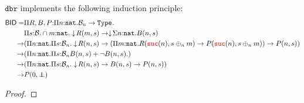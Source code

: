 \begin{lemma}
  $\mathtt{dbr}$ implements the following induction principle: 
  \begin{align*}
    \mathsf{BID} = &\pity{\isOf{R,B,P}{\pity{\isOf{n}{\nat}}{\nseq{n} \to \type{}}}}{\\
          &\pity{\isOf{s}{\baire}}{\intty{\isOf{m}{\nat}}{\squash{R(m,s)}} \to \squash{\sigmaty{\isOf{n}{\nat}}{B(n,s)}}}\\
      \to &(\pity{\isOf{n}{\nat}}{\pity{\isOf{s}{\nseq{n}}}
      {\squash{R(n,s)} \to (\pity{\isOf{m}{\nat}}{R(\suc{n}, s \oplus_n m) \to P(\suc{n}, s \oplus_n m)}) 
      \to P(n,s)}})\\
      \to &(\pity{\isOf{n}{\nat}}{\pity{\isOf{s}{\nseq{n}}{B(n,s) + \neg B(n,s)}}}) \\
      \to &(\pity{\isOf{n}{\nat}}{\pity{\isOf{s}{\nseq{n}}}{\squash{R(n,s)} \to 
      B(n,s) \to P(n,s)}})\\
      \to & P(0,\empseq)
    }
  \end{align*}
\end{lemma}

\begin{proof}
\end{proof}
